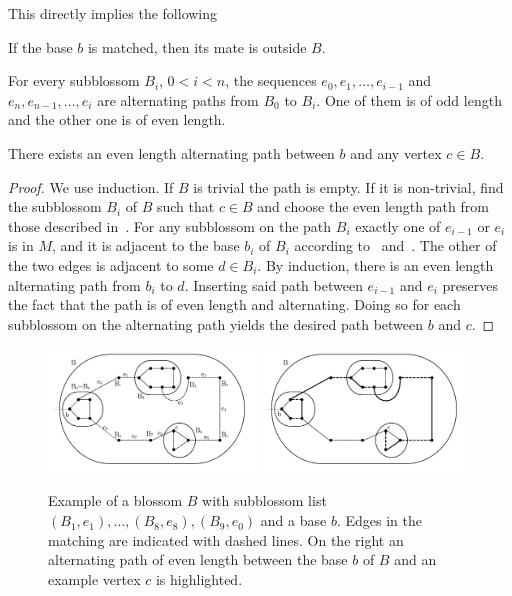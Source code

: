 This directly implies the following

\begin{fact}\label{fact:base_mate}
    If the base $b$ is matched, then its mate is outside $B$.
\end{fact}

\begin{fact}\label{fact:blossom_two_paths}
    For every subblossom $B_i$, $0 < i < n$, the sequences $e_0, e_1, \dots, e_{i-1}$ and $e_n, e_{n-1}, \dots, e_i$ are alternating paths from $B_0$ to $B_i$. One of them is of odd length and the other one is of even length.
\end{fact}

\begin{fact}
    There exists an even length alternating path between $b$ and any vertex $c \in B$.

\begin{proof}
    We use induction. If $B$ is trivial the path is empty. If it is non-trivial, find the subblossom $B_i$ of $B$ such that $c \in B$ and choose the even length path from those described in~. For any subblossom on the path $B_i$ exactly one of $e_{i-1}$ or $e_{i}$ is in $M$, and it is adjacent to the base $b_i$ of $B_i$ according to~ and~. The other of the two edges is adjacent to some $d \in B_i$. By induction, there is an even length alternating path from $b_i$ to $d$. Inserting said path between $e_{i-1}$ and $e_i$ preserves the fact that the path is of even length and alternating. Doing so for each subblossom on the alternating path yields the desired path between $b$ and $c$.
\end{proof}
\end{fact}

\begin{figure}
    \centering
    \includegraphics*[width=0.49\textwidth]{figures/Basic Blossom.png}
    \includegraphics*[width=0.49\textwidth]{figures/Blossom alternating clean.png}
    \caption{Example of a blossom $B$ with subblossom list $(B_1, e_1), \dots, (B_8, e_8), (B_9, e_0)$ and a base $b$. Edges in the matching are indicated with dashed lines. On the right an alternating path of even length between the base $b$ of $B$ and an example vertex $c$ is highlighted.}\label{fig:odd_expansion}
\end{figure}

